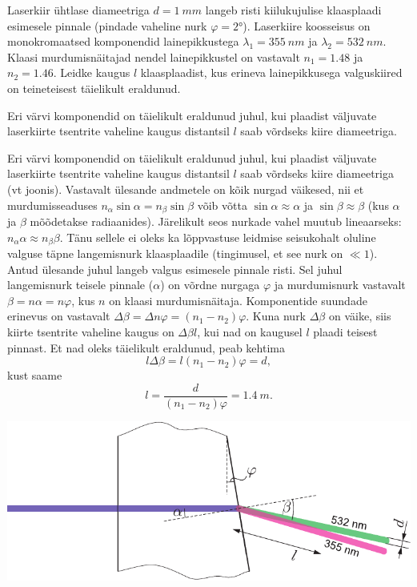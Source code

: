 
Laserkiir ühtlase diameetriga $d=\SI{1}{mm}$ langeb risti kiilukujulise klaasplaadi esimesele pinnale (pindade vaheline nurk $\varphi=\ang{2}$). Laserkiire koosseisus on monokromaatsed komponendid lainepikkustega $\lambda_1=\SI{355}{nm}$ ja $\lambda_2=\SI{532}{nm}$. Klaasi murdumisnäitajad nendel lainepikkustel on vastavalt $n_1=\num{1.48}$ ja $n_2=\num{1.46}$. Leidke kaugus $l$ klaasplaadist, kus erineva lainepikkusega valguskiired on teineteisest täielikult eraldunud.

\hint
Eri värvi komponendid on täielikult eraldunud juhul, kui plaadist väljuvate laserkiirte tsentrite vaheline kaugus distantsil $l$ saab võrdseks kiire diameetriga.

\solu
Eri värvi komponendid on täielikult eraldunud juhul, kui plaadist väljuvate laserkiirte tsentrite vaheline kaugus distantsil $l$ saab võrdseks kiire diameetriga (vt joonis). Vastavalt ülesande andmetele on kõik nurgad väikesed, nii et murdumisseaduses $n_\alpha\sin\alpha=n_\beta\sin\beta$ võib võtta $\sin\alpha\approx\alpha$ ja $\sin\beta\approx\beta$ (kus $\alpha$ ja $\beta$ mõõdetakse radiaanides). Järelikult seos nurkade vahel muutub lineaarseks: $n_\alpha\alpha\approx n_\beta\beta$. Tänu sellele ei oleks ka lõppvastuse leidmise seisukohalt oluline valguse täpne langemisnurk klaasplaadile (tingimusel, et see nurk on $\ll 1$). Antud ülesande juhul langeb valgus esimesele pinnale risti. Sel juhul langemisnurk teisele pinnale ($\alpha$) on võrdne nurgaga $\varphi$ ja murdumisnurk vastavalt $\beta=n\alpha=n\varphi$, kus $n$ on klaasi murdumisnäitaja. Komponentide suundade erinevus on vastavalt $\Delta\beta=\Delta n\varphi=(n_1-n_2)\varphi$. Kuna nurk $\Delta\beta$ on väike, siis kiirte tsentrite vaheline kaugus on $\Delta\beta l$, kui nad on kaugusel $l$ plaadi teisest pinnast. Et nad oleks täielikult eraldunud, peab kehtima
\[
l\Delta\beta=l(n_1-n_2)\varphi=d,
\]
kust saame
\[
l = \frac{d}{(n_1-n_2)\varphi} = \SI{1.4}{m}.
\]

\begin{center}
	\includegraphics[width=0.93\linewidth]{2017-v3g-03-laser-lahend.pdf}
\end{center}

